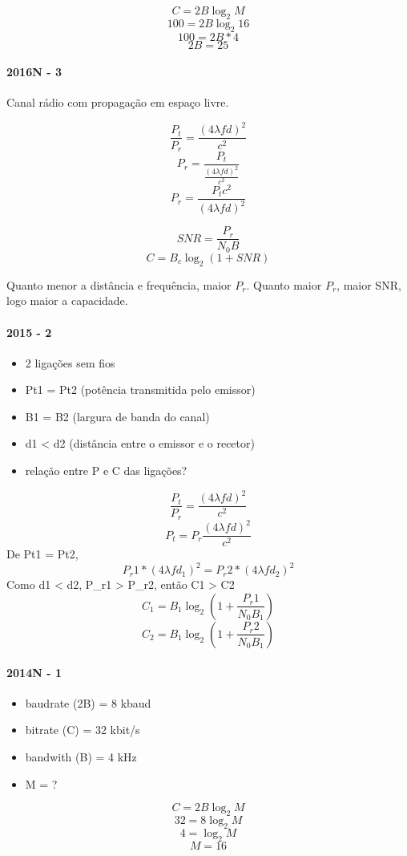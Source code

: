 \documentclass[../resumosRCOM.tex]{subfiles}
\begin{document}
\[C = 2B\log_2 M\]
\[100 = 2B\log_2 16\]
\[100 = 2B*4\]
\[2B = 25\]

\paragraph{2016N - 3}
Canal rádio com propagação em espaço livre.

\[\frac{P_t}{P_r}=\frac{(4\lambda fd)^2}{c^2}\]
\[{P_r}=\frac{P_t}{\frac{(4\lambda fd)^2}{c^2}}\]
\[{P_r}=\frac{P_tc^2}{(4\lambda fd)^2}\]

\[SNR = \frac{P_r}{N_0B}\]
\[C = B_c\log_2 (1 + SNR)\]

Quanto menor a distância e frequência, maior \(P_r\).
Quanto maior \(P_r\), maior SNR, logo maior a capacidade.

\paragraph{2015 - 2}
\begin{itemize}
    \item 2 ligações sem fios
    \item Pt1 = Pt2 (potência transmitida pelo emissor)
    \item B1 = B2 (largura de banda do canal)
    \item d1 < d2 (distância entre o emissor e o recetor)
    \item relação entre P e C das ligações?
\end{itemize}

\[\frac{P_t}{P_r}=\frac{(4\lambda fd)^2}{c^2}\]
\[P_t=P_r\frac{(4\lambda fd)^2}{c^2}\]
De Pt1 = Pt2,
\[P_r1*(4\lambda fd_1)^2 = P_r2*(4\lambda fd_2)^2\]
Como d1 < d2, P\_r1 > P\_r2, então C1 > C2
\[C_1 = B_1\log_2 (1 + \frac{P_r1}{N_0B_1})\]
\[C_2 = B_1\log_2 (1 + \frac{P_r2}{N_0B_1})\]

\paragraph{2014N - 1}
\begin{itemize}
    \item baudrate (2B) = 8 kbaud
    \item bitrate (C) = 32 kbit/s
    \item bandwith (B) = 4 kHz
    \item M = ?
\end{itemize}

\[C = 2B\log_2 M\]
\[32 = 8\log_2 M\]
\[4 = \log_2 M\]
\[M = 16\]
\end{document}
